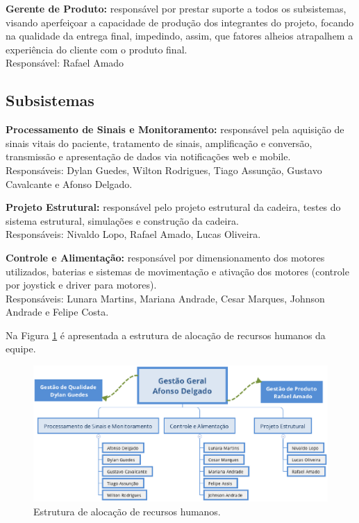 \textbf{Gerente de Produto:} responsável por prestar suporte a todos os subsistemas, visando aperfeiçoar a capacidade de produção dos integrantes do projeto, focando na qualidade da entrega final, impedindo, assim,  que fatores alheios atrapalhem a experiência do cliente com o produto final.
\\Responsável: Rafael Amado

\subsection{Subsistemas}

\textbf{Processamento de Sinais e Monitoramento:} responsável pela aquisição de sinais vitais do paciente,
tratamento de sinais, amplificação e conversão, transmissão e apresentação de
dados via notificações web e mobile.
\\Responsáveis: Dylan Guedes, Wilton Rodrigues, Tiago Assunção, Gustavo Cavalcante e Afonso Delgado.

\textbf{Projeto Estrutural:} responsável pelo projeto estrutural da cadeira, testes
do sistema estrutural, simulações e construção da cadeira.
\\Responsáveis: Nivaldo Lopo, Rafael Amado, Lucas Oliveira.

\textbf{Controle e Alimentação:} responsável por dimensionamento dos motores utilizados,
baterias e sistemas de movimentação e ativação dos motores (controle por
joystick e driver para motores).
\\Responsáveis: Lunara Martins, Mariana Andrade, Cesar Marques, Johnson Andrade e Felipe Costa.

Na Figura \ref{fig:flux_rh} é apresentada a estrutura de alocação de recursos humanos da equipe.


\begin{figure}[h]
    \centering
    \includegraphics[keepaspectratio=true,width=\textwidth]{figuras/rh-umiss.eps}
    \caption{Estrutura de alocação de recursos humanos.}
    \label{fig:flux_rh}
\end{figure}

